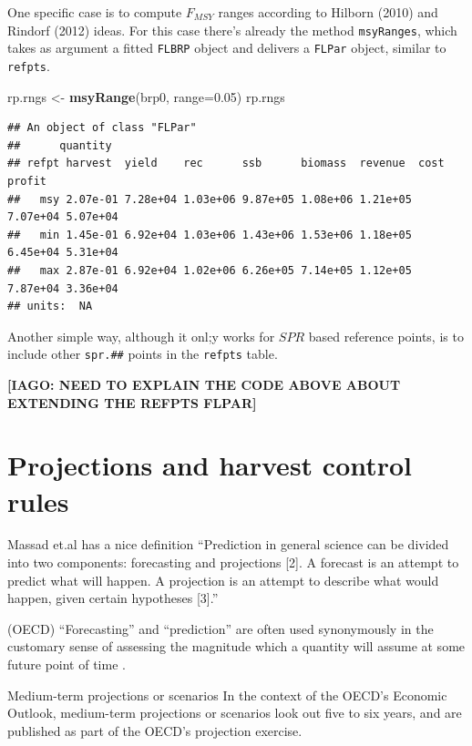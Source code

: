 \documentclass[
]{book}
\newenvironment{Shaded}{\begin{snugshade}}{\end{snugshade}}
\newcommand{\AttributeTok}[1]{\textcolor[rgb]{0.13,0.29,0.53}{#1}}
\newcommand{\FloatTok}[1]{\textcolor[rgb]{0.00,0.00,0.81}{#1}}
\newcommand{\FunctionTok}[1]{\textcolor[rgb]{0.13,0.29,0.53}{\textbf{#1}}}
\newcommand{\NormalTok}[1]{#1}
\newcommand{\OtherTok}[1]{\textcolor[rgb]{0.56,0.35,0.01}{#1}}
\begin{document}
One specific case is to compute \(F_{MSY}\) ranges according to Hilborn (2010) and Rindorf (2012) ideas. For this case there's already the method \texttt{msyRanges}, which takes as argument a fitted \texttt{FLBRP} object and delivers a \texttt{FLPar} object, similar to \texttt{refpts}.

\begin{Shaded}
\begin{Highlighting}[]
\NormalTok{rp.rngs }\OtherTok{\textless{}{-}} \FunctionTok{msyRange}\NormalTok{(brp0, }\AttributeTok{range=}\FloatTok{0.05}\NormalTok{)}
\NormalTok{rp.rngs}
\end{Highlighting}
\end{Shaded}

\begin{verbatim}
## An object of class "FLPar"
##      quantity
## refpt harvest  yield    rec      ssb      biomass  revenue  cost     profit  
##   msy 2.07e-01 7.28e+04 1.03e+06 9.87e+05 1.08e+06 1.21e+05 7.07e+04 5.07e+04
##   min 1.45e-01 6.92e+04 1.03e+06 1.43e+06 1.53e+06 1.18e+05 6.45e+04 5.31e+04
##   max 2.87e-01 6.92e+04 1.02e+06 6.26e+05 7.14e+05 1.12e+05 7.87e+04 3.36e+04
## units:  NA
\end{verbatim}

Another simple way, although it onl;y works for \(SPR\) based reference points, is to include other \texttt{spr.\#\#} points in the \texttt{refpts} table.

\textbf{{[}IAGO: NEED TO EXPLAIN THE CODE ABOVE ABOUT EXTENDING THE REFPTS FLPAR{]}}

\hypertarget{projections-and-harvest-control-rules}{%
\chapter{Projections and harvest control rules}\label{projections-and-harvest-control-rules}}

Massad et.al has a nice definition ``Prediction in general science can be divided into two components: forecasting and projections {[}2{]}. A forecast is an attempt to predict what will happen. A projection is an attempt to describe what would happen, given certain hypotheses {[}3{]}.''

(OECD)
``Forecasting'' and ``prediction'' are often used synonymously in the customary sense of assessing the magnitude which a quantity will assume at some future point of time .

Medium-term projections or scenarios In the context of the OECD's Economic Outlook, medium-term projections or scenarios look out five to six years, and are published as part of the OECD's projection exercise.
\end{document}
